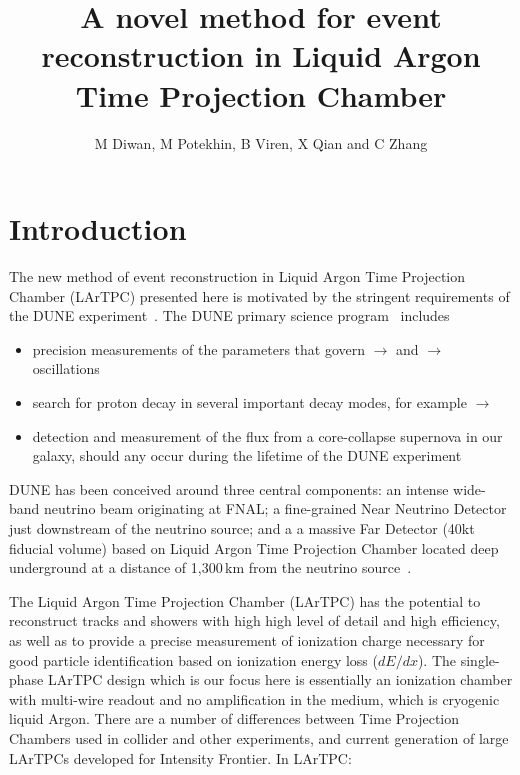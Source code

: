 \documentclass[a4paper]{jpconf}
\begin{document}
\title{A novel method for event reconstruction in Liquid Argon Time Projection Chamber}

\author{M Diwan, M Potekhin, B Viren, X Qian and C Zhang}

\address{Brookhaven National Laboratory, Upton, NY11973, USA}





\section{Introduction}

The new method of event reconstruction in Liquid Argon Time Projection Chamber (LArTPC) presented here
is motivated by the stringent requirements of the DUNE experiment~\cite{cdrVol1}. The DUNE primary science
program~\cite{cdrVol2} includes
\begin{itemize}
\item precision measurements of the parameters that govern \HepParticle{\nu}{\mu}{} $\rightarrow$  and
 \HepAntiParticle{\nu}{\mu}{} $\rightarrow$  oscillations
\item search for proton decay in several important decay modes, for example  $\rightarrow$ \HepAntiParticle{\nu}{}{}
\item detection and measurement of the  flux from a core-collapse supernova in our galaxy, should any occur during the lifetime
of the DUNE experiment
\end{itemize}
\noindent
DUNE has been conceived around three central components: an intense wide-band neutrino beam originating at FNAL; a fine-grained Near Neutrino Detector
just downstream of the neutrino source; and a a massive Far Detector (40kt fiducial volume) based on Liquid Argon Time Projection Chamber located deep
underground at a distance of 1,300\,km from the neutrino source~\cite{cdrVol4}.

The  Liquid Argon Time Projection Chamber (LArTPC)  has the potential to reconstruct tracks and showers with high high level of detail and high efficiency,
as well as to provide a precise measurement of ionization charge necessary for good particle identification based on ionization energy loss ($dE/dx$).
The single-phase LArTPC design which is our focus here is essentially an ionization chamber with multi-wire readout and no amplification in the medium,
which is cryogenic liquid Argon. There are a number of differences between Time Projection Chambers used in collider and other experiments, and current generation
of large LArTPCs developed for Intensity Frontier. In LArTPC:
\end{document}
